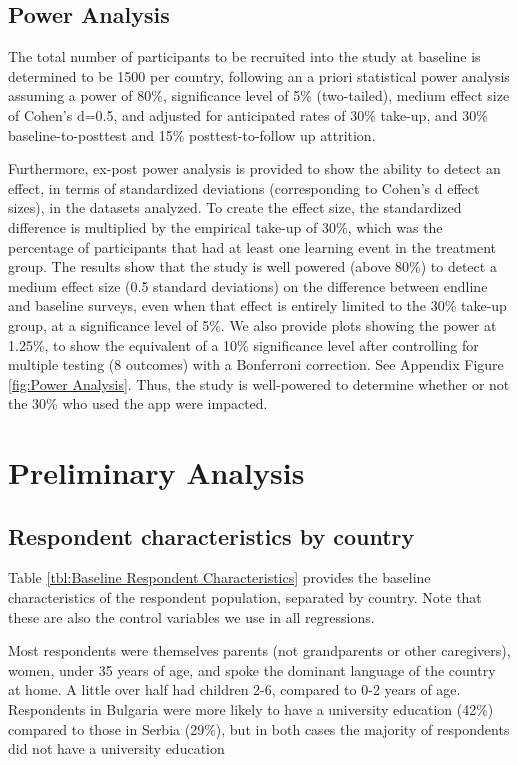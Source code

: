 \documentclass{article}
\begin{document}
\subsection{Power Analysis}

The total number of participants to be recruited into the study at baseline is determined to be 1500 per country, following an a priori statistical power analysis assuming a power of 80\%, significance level of 5\% (two-tailed), medium effect size of Cohen’s d=0.5, and adjusted for anticipated rates of 30\% take-up, and 30\% baseline-to-posttest and 15\% posttest-to-follow up attrition.

Furthermore, ex-post power analysis is provided to show the ability to detect an effect, in terms of standardized deviations (corresponding to Cohen’s d effect sizes), in the datasets analyzed. To create the effect size, the standardized difference is multiplied by the empirical take-up of 30\%, which was the percentage of participants that had at least one learning event in the treatment group. The results show that the study is well powered (above 80\%) to detect a medium effect size (0.5 standard deviations) on the difference between endline and baseline surveys, even when that effect is entirely limited to the 30\% take-up group, at a significance level of 5\%. We also provide plots showing the power at 1.25\%, to show the equivalent of a 10\% significance level after controlling for multiple testing (8 outcomes) with a Bonferroni correction. See Appendix Figure \ref{fig:Power Analysis}. Thus, the study is well-powered to determine whether or not the 30\% who used the app were impacted.


\section{Preliminary Analysis}

\subsection{Respondent characteristics by country}

Table \ref{tbl:Baseline Respondent Characteristics} provides the baseline characteristics of the respondent population, separated by country. Note that these are also the control variables we use in all regressions.

Most respondents were themselves parents (not grandparents or other caregivers), women, under 35 years of age, and spoke the dominant language of the country at home. A little over half had children 2-6, compared to 0-2 years of age. Respondents in Bulgaria were more likely to have a university education (42\%) compared to those in Serbia (29\%), but in both cases the majority of respondents did not have a university education
\end{document}
